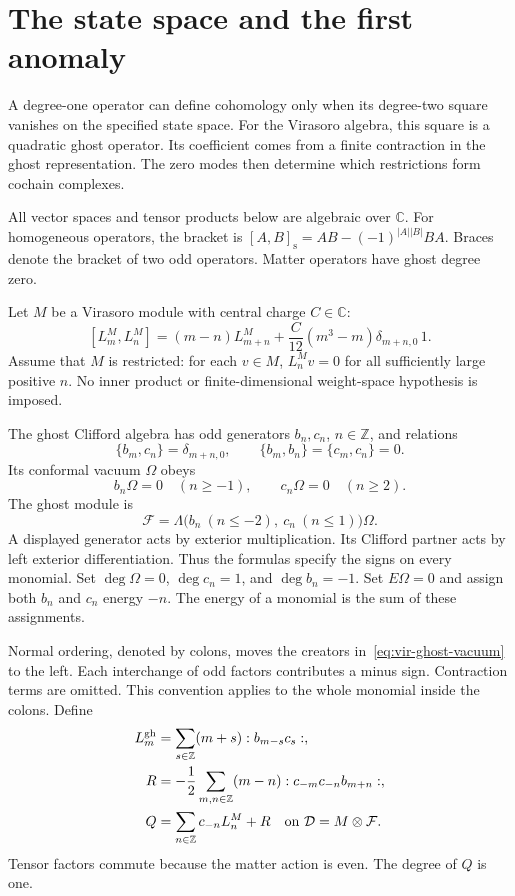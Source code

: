 \section{The state space and the first anomaly}

A degree-one operator can define cohomology only when its degree-two square vanishes on the specified state space.
For the Virasoro algebra, this square is a quadratic ghost operator.
Its coefficient comes from a finite contraction in the ghost representation.
The zero modes then determine which restrictions form cochain complexes.

All vector spaces and tensor products below are algebraic over $\mathbb C$.
For homogeneous operators, the bracket is
$[A,B]_{\mathrm s}=AB-(-1)^{|A||B|}BA$.
Braces denote the bracket of two odd operators.
Matter operators have ghost degree zero.

Let $M$ be a Virasoro module with central charge $C\in\mathbb C$:
\begin{equation}\label{eq:vir-matter-relation}
 [L_m^M,L_n^M]=(m-n)L_{m+n}^M+
 \frac{C}{12}(m^3-m)\delta_{m+n,0}\,1.
\end{equation}
Assume that $M$ is restricted: for each $v\in M$, $L_n^Mv=0$ for all sufficiently large positive $n$.
No inner product or finite-dimensional weight-space hypothesis is imposed.

The ghost Clifford algebra has odd generators $b_n,c_n$, $n\in\mathbb Z$, and relations
\[
 \{b_m,c_n\}=\delta_{m+n,0},\qquad
 \{b_m,b_n\}=\{c_m,c_n\}=0.
\]
Its conformal vacuum $\Omega$ obeys
\begin{equation}\label{eq:vir-ghost-vacuum}
 b_n\Omega=0\quad(n\geq-1),\qquad
 c_n\Omega=0\quad(n\geq2).
\end{equation}
The ghost module is
\[
 \mathcal F=\Lambda\bigl(b_n\ (n\leq-2),\ c_n\ (n\leq1)\bigr)\Omega.
\]
A displayed generator acts by exterior multiplication.
Its Clifford partner acts by left exterior differentiation.
Thus the formulas specify the signs on every monomial.
Set $\deg\Omega=0$, $\deg c_n=1$, and $\deg b_n=-1$.
Set $E\Omega=0$ and assign both $b_n$ and $c_n$ energy $-n$.
The energy of a monomial is the sum of these assignments.

Normal ordering, denoted by colons, moves the creators in~\eqref{eq:vir-ghost-vacuum} to the left.
Each interchange of odd factors contributes a minus sign.
Contraction terms are omitted.
This convention applies to the whole monomial inside the colons.
Define
\begin{align}
 L_m^{\mathrm{gh}}&=\sum_{s\in\mathbb Z}(m+s):b_{m-s}c_s:,
 \label{eq:vir-ghost-L}\\
 R&=-\frac12\sum_{m,n\in\mathbb Z}(m-n):c_{-m}c_{-n}b_{m+n}:,
 \label{eq:vir-ghost-R}\\
 Q&=\sum_{n\in\mathbb Z}c_{-n}L_n^M+R
 \quad\hbox{on }\mathcal D=M\otimes\mathcal F.
 \label{eq:vir-Q}
\end{align}
Tensor factors commute because the matter action is even.
The degree of $Q$ is one.

